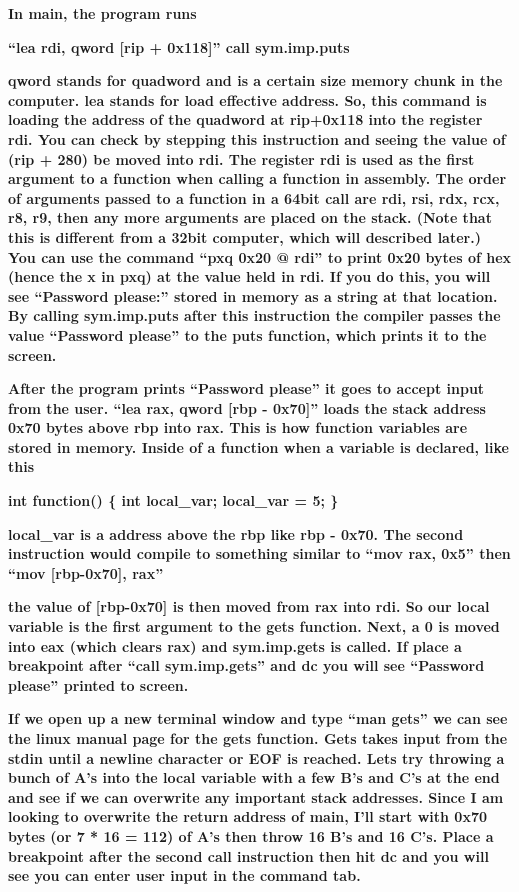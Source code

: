 \documentclass[letterpaper]{article}
\newcommand{\sitfig}[3]{
\begin{figure}[H]
\centering
\makebox[\textwidth][c]{
#2
}
\label{#1}
\end{figure}
}
\newcommand{\sitgfx}[4][scale=1.0]{
\sitfig{#3}{\texttt{[image: \#2]}}{#4}
}
\begin{document}
\textbf{In main, the program runs}

\textbf{{}``lea rdi, qword [rip + 0x118]''\newline
call sym.imp.puts}

\textbf{qword stands for quadword and is a certain size memory chunk in the computer. lea stands for load effective
address. So, this command is loading the address of the quadword at rip+0x118 into the register rdi. You can check by
stepping this instruction and seeing the value of (rip + 280) be moved into rdi. The register rdi is used as the first
argument to a function when calling a function in assembly. The order of arguments passed to a function in a 64bit call
are rdi, rsi, rdx, rcx, r8, r9, then any more arguments are placed on the stack. (Note that this is different from a
32bit computer, which will described later.) You can use the command ``pxq 0x20 @ rdi'' to print 0x20 bytes of hex
(hence the x in pxq) at the value held in rdi. If you do this, you will see ``Password please:'' stored in memory as a
string at that location. By calling sym.imp.puts after this instruction the compiler passes the value ``Password
please'' to the puts function, which prints it to the screen.}

  
\sitgfx[width=5.8335in,height=3.6457in]{FINALWORKINGDOCFORMERLYPRECURSOR-img090.png}{fig:unk}{TODO CAPTION}
 

\textbf{After the program prints ``Password please'' it goes to accept input from the user. ``lea rax, qword [rbp -
0x70]'' loads the stack address 0x70 bytes above rbp into rax. This is how function variables are stored in memory.
Inside of a function when a variable is declared, like this}

\textbf{int function() \{ int local\_var; local\_var = 5; \}}

\textbf{local\_var is a address above the rbp like rbp - 0x70. The second instruction would compile to something similar
to ``mov rax, 0x5'' then ``mov [rbp-0x70], rax''}

\textbf{the value of [rbp-0x70] is then moved from rax into rdi. So our local variable is the first argument to the gets
function. Next, a 0 is moved into eax (which clears rax) and sym.imp.gets is called. If place a breakpoint after ``call
sym.imp.gets'' and dc you will see ``Password please'' printed to screen.}

  
\sitgfx[width=5.8335in,height=2.9654in]{FINALWORKINGDOCFORMERLYPRECURSOR-img091.png}{fig:unk}{TODO CAPTION}
 

\textbf{If we open up a new terminal window and type ``man gets'' we can see the linux manual page for the gets
function. Gets takes input from the stdin until a newline character or EOF is reached. Lets try throwing a bunch of A's
into the local variable with a few B's and C's at the end and see if we can overwrite any important stack addresses.
Since I am looking to overwrite the return address of main, I'll start with 0x70 bytes (or 7 * 16 = 112) of A's then
throw 16 B's and 16 C's. Place a breakpoint after the second call instruction then hit dc and you will see you can
enter user input in the command tab.}
\end{document}
